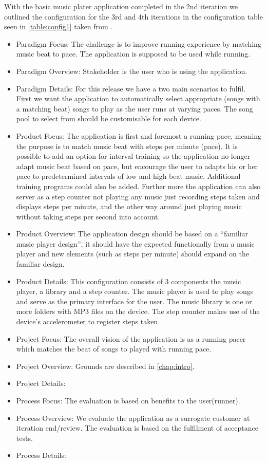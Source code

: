 With the basic music plater application completed in the 2nd iteration we outlined the configuration for the 3rd and 4th iterations in the configuration table seen in \ref{table:config1} taken from \citet{essence:config}.




\begin{itemize}
\item Paradigm Focus: The challenge is to improve running experience by matching music beat to pace. The application is supposed to be used while running.
\item Paradigm Overview: Stakeholder is the user who is using the application.
\item Paradigm Details: For this release we have a two main scenarios to fulfil. First we want the application to automatically select appropriate (songs with a matching beat) songs to play as the user runs at varying paces. The song pool to select from should be customisable for each device.
\item Product Focus: The application is first and foremost a running pace, meaning the purpose is to match music beat with steps per minute (pace). It is possible to add an option for interval training so the application no longer adapt music beat based on pace, but encourage the user to adapts his or her pace to predetermined intervals of low and high beat music. Additional training programs could also be added. Further more the application can also server as a step counter not playing any music just recording steps taken and displays steps per minute, and the other way around just playing music without taking steps per second into account.
\item Product Overview: The application design should be based on a ``familiar music player design'', it should have the expected functionally from a music player and new elements (such as steps per minute) should expand on the familiar design. 
\item Product Details: This configuration consists of 3 components the music player, a library and a step counter. The music player is used to play songs and serve as the primary interface for the user. The music library is one or more folders with MP3 files on the device. The step counter makes use of the device's accelerometer to register steps taken.
\item Project Focus: The overall vision of the application is as a running pacer which matches the beat of songs to played with running pace.
\item Project Overview: Grounds are described in \cref{chap:intro}.
\item Project Details: 
\item Process Focus: The evaluation is based on benefits to the user(runner).
\item Process Overview: We evaluate the application as a surrogate customer at iteration end/review. The evaluation is based on the fulfilment of acceptance tests.
\item Process Details: 

\end{itemize}